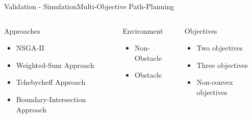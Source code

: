 \begin{frame}{Validation - Simulation}{Multi-Objective Path-Planning}

\begin{columns}[t]

\begin{block}{Approaches}
\begin{itemize}
\item NSGA-II
\item Weighted-Sum Approach
\item Tchebycheff Approach
\item Boundary-Intersection Approach
\end{itemize}
\end{block}

\begin{block}{Environment}
\begin{itemize}
\item Non-Obstacle
\item Obstacle
\end{itemize}
\end{block}

\begin{block}{Objectives}
\begin{itemize}
\item Two objectives
\item Three objectives
\item Non-convex objectives
\end{itemize}
\end{block}

\end{columns}

\end{frame}
